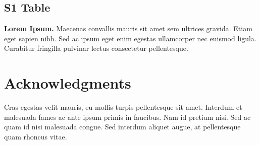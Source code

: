 \documentclass[10pt,a4paper]{article}  %
\begin{document}
\subsection*{S1 Table}
\label{S1_Table}
{\bf Lorem Ipsum.} Maecenas convallis mauris sit amet sem ultrices gravida. Etiam eget sapien nibh. Sed ac ipsum eget enim egestas ullamcorper nec euismod ligula. Curabitur fringilla pulvinar lectus consectetur pellentesque.

\section*{Acknowledgments}
Cras egestas velit mauris, eu mollis turpis pellentesque sit amet. Interdum et malesuada fames ac ante ipsum primis in faucibus. Nam id pretium nisi. Sed ac quam id nisi malesuada congue. Sed interdum aliquet augue, at pellentesque quam rhoncus vitae.

\nolinenumbers

%
%
% 


\end{document}
